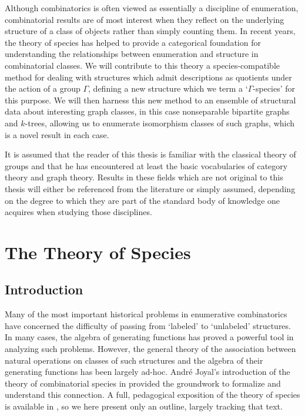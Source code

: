 \documentclass[sectionflow,singlespace,twoside,boldmathhdr]{brandiss} %
\numberwithin{section}{chapter}
\numberwithin{figure}{chapter}
\begin{document}
\begin{disspreface}
  Although combinatorics is often viewed as essentially a discipline of enumeration, combinatorial results are of most interest when they reflect on the underlying structure of a class of objects rather than simply counting them.
  In recent years, the theory of species has helped to provide a categorical foundation for understanding the relationships between enumeration and structure in combinatorial classes.
  We will contribute to this theory a species-compatible method for dealing with structures which admit descriptions as quotients under the action of a group $\Gamma$, defining a new structure which we term a `$\Gamma$-species' for this purpose.
  We will then harness this new method to an ensemble of structural data about interesting graph classes, in this case nonseparable bipartite graphs and $k$-trees, allowing us to enumerate isomorphism classes of such graphs, which is a novel result in each case.

  It is assumed that the reader of this thesis is familiar with the classical theory of groups and that he has encountered at least the basic vocabularies of category theory and graph theory.
  Results in these fields which are not original to this thesis will either be referenced from the literature or simply assumed, depending on the degree to which they are part of the standard body of knowledge one acquires when studying those disciplines.
\end{disspreface}


\setcounter{tocdepth}{2}
\tableofcontents %

\listoffigures %

\listoftables %

\mainmatter

\chapter{The Theory of Species}\label{c:species}
\section{Introduction}\label{s:introspec}
Many of the most important historical problems in enumerative combinatorics have concerned the difficulty of passing from `labeled' to `unlabeled' structures.
In many cases, the algebra of generating functions has proved a powerful tool in analyzing such problems.
However, the general theory of the association between natural operations on classes of such structures and the algebra of their generating functions has been largely ad-hoc.
Andr\'{e} Joyal's introduction of the theory of combinatorial species in \cite{joy:species} provided the groundwork to formalize and understand this connection.
A full, pedagogical exposition of the theory of species is available in \cite{bll:species}, so we here present only an outline, largely tracking that text.
\end{document}
